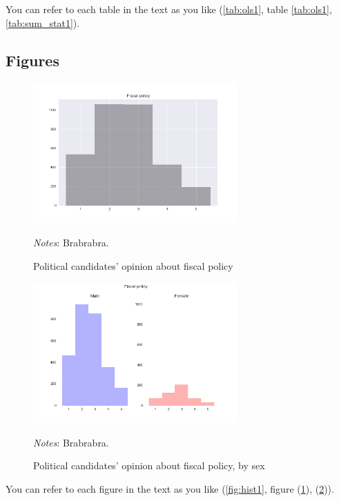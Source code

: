 \documentclass[11pt]{article}
\begin{document}
You can refer to each table in the text as you like (\autoref{tab:ols1}, table \ref{tab:ols1}, \ref{tab:sum_stat1}).

\subsection{Figures}


\begin{figure}[H] 
	\begin{center}
	\caption{Political candidates' opinion about fiscal policy} 
	\includegraphics[width=0.7\textwidth]{yn_fiscalpol_py.png} \label{fig:hist1}
	\end{center}	
	 \vspace{-5mm}
	{\footnotesize {\it Notes}: Brabrabra.}
\end{figure}


\begin{figure}[H]
	\begin{center}
	\caption{Political candidates' opinion about fiscal policy, by sex} 
	\includegraphics[width=0.7\textwidth]{yn_fiscalpol_bysex_py.png} \label{fig:hist2} 
	\end{center}
	\vspace{-5mm}
	{\footnotesize {\it Notes}: Brabrabra.}
\end{figure}


You can refer to each figure in the text as you like (\autoref{fig:hist1}, figure (\ref{fig:hist1}), (\ref{fig:hist2})).


\end{document}
